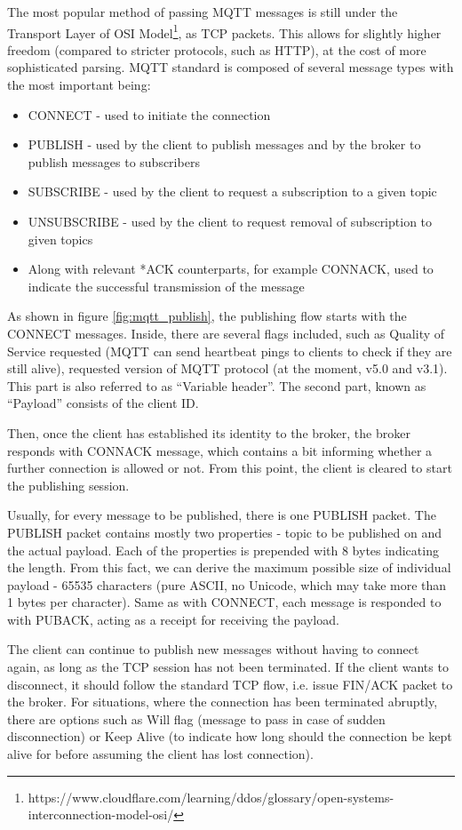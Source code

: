 The most popular method of passing MQTT messages is still under the Transport Layer of OSI Model\footnote{https://www.cloudflare.com/learning/ddos/glossary/open-systems-interconnection-model-osi/}, as TCP packets. This allows for slightly higher freedom (compared to stricter protocols, such as HTTP), at the cost of more sophisticated parsing. MQTT standard is composed of several message types with the most important being:
\begin{itemize}
  \item CONNECT - used to initiate the connection
  \item PUBLISH - used by the client to publish messages and by the broker to publish messages to subscribers
  \item SUBSCRIBE - used by the client to request a subscription to a given topic
  \item UNSUBSCRIBE - used by the client to request removal of subscription to given topics
  \item Along with relevant *ACK counterparts, for example CONNACK, used to indicate the successful transmission of the message
\end{itemize}
As shown in figure \ref{fig:mqtt_publish}, the publishing flow starts with the CONNECT messages. Inside, there are several flags included, such as Quality of Service requested (MQTT can send heartbeat pings to clients to check if they are still alive), requested version of MQTT protocol (at the moment, v5.0 and v3.1). This part is also referred to as ``Variable header''. The second part, known as ``Payload'' consists of the client ID.

Then, once the client has established its identity to the broker, the broker responds with CONNACK message, which contains a bit informing whether a further connection is allowed or not. From this point, the client is cleared to start the publishing session.

Usually, for every message to be published, there is one PUBLISH packet. The PUBLISH packet contains mostly two properties - topic to be published on and the actual payload. Each of the properties is prepended with 8 bytes indicating the length. From this fact, we can derive the maximum possible size of individual payload - 65535 characters (pure ASCII, no Unicode, which may take more than 1 bytes per character). Same as with CONNECT, each message is responded to with PUBACK, acting as a receipt for receiving the payload.

The client can continue to publish new messages without having to connect again, as long as the TCP session has not been terminated. If the client wants to disconnect, it should follow the standard TCP flow, i.e. issue FIN/ACK packet to the broker. For situations, where the connection has been terminated abruptly, there are options such as Will flag (message to pass in case of sudden disconnection) or Keep Alive (to indicate how long should the connection be kept alive for before assuming the client has lost connection).

